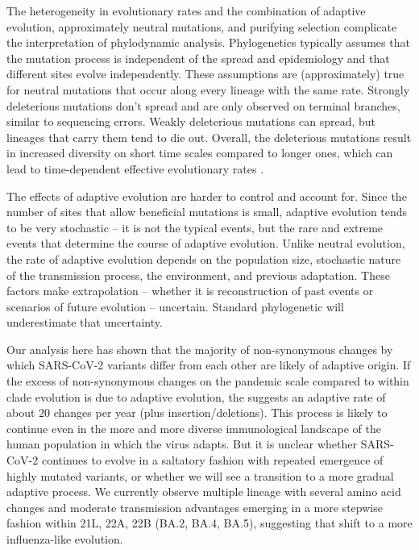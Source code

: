 \documentclass[aps,rmp, twocolumn]{revtex4}
\begin{document}
The heterogeneity in evolutionary rates and the combination of adaptive evolution, approximately neutral mutations, and purifying selection complicate the interpretation of phylodynamic analysis.
Phylogenetics typically assumes that the mutation process is independent of the spread and epidemiology and that different sites evolve independently.
These assumptions are (approximately) true for neutral mutations that occur along every lineage with the same rate.
Strongly deleterious mutations don't spread and are only observed on terminal branches, similar to sequencing errors.
Weakly deleterious mutations can spread, but lineages that carry them tend to die out.
Overall, the deleterious mutations result in increased diversity on short time scales compared to longer ones, which can lead to time-dependent effective evolutionary rates \citep{wertheim_purifying_2011}.

The effects of adaptive evolution are harder to control and account for.
Since the number of sites that allow beneficial mutations is small, adaptive evolution tends to be very stochastic -- it is not the typical events, but the rare and extreme events that determine the course of adaptive evolution.
Unlike neutral evolution, the rate of adaptive evolution depends on the population size, stochastic nature of the transmission process, the environment, and previous adaptation.
These factors make extrapolation -- whether it is reconstruction of past events or scenarios of future evolution -- uncertain.
Standard phylogenetic will underestimate that uncertainty.

Our analysis here has shown that the majority of non-synonymous changes by which SARS-CoV-2 variants differ from each other are likely of adaptive origin.
If the excess of non-synonymous changes on the pandemic scale compared to within clade evolution is due to adaptive evolution, the suggests an adaptive rate of about 20 changes per year (plus insertion/deletions).
This process is likely to continue even in the more and more diverse immunological landscape of the human population in which the virus adapts.
But it is unclear whether SARS-CoV-2 continues to evolve in a saltatory fashion with repeated emergence of highly mutated variants, or whether we will see a transition to a more gradual adaptive process.
We currently observe multiple lineage with several amino acid changes and moderate transmission advantages emerging in a more stepwise fashion within 21L, 22A, 22B (BA.2, BA.4, BA.5), suggesting that shift to a more influenza-like evolution.
\end{document}
